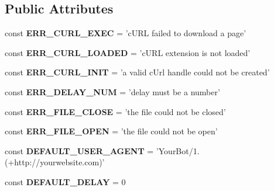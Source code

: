 \subsection*{Public Attributes}
\begin{DoxyCompactItemize}
\item 
\hypertarget{classCurl_a53d3e9dc49608272c42f0c415b7a661b}{const {\bfseries E\-R\-R\-\_\-\-C\-U\-R\-L\-\_\-\-E\-X\-E\-C} = 'c\-U\-R\-L failed to download a page'}\label{d0/d69/classCurl_a53d3e9dc49608272c42f0c415b7a661b}

\item 
\hypertarget{classCurl_a1959072729820f7c00b1f98797a33201}{const {\bfseries E\-R\-R\-\_\-\-C\-U\-R\-L\-\_\-\-L\-O\-A\-D\-E\-D} = 'c\-U\-R\-L extension is not loaded'}\label{d0/d69/classCurl_a1959072729820f7c00b1f98797a33201}

\item 
\hypertarget{classCurl_a71ac50dd86f462c8bd94b286131da012}{const {\bfseries E\-R\-R\-\_\-\-C\-U\-R\-L\-\_\-\-I\-N\-I\-T} = 'a valid c\-Url handle could not be created'}\label{d0/d69/classCurl_a71ac50dd86f462c8bd94b286131da012}

\item 
\hypertarget{classCurl_af514a5b42b3e720b3540c43a6c351d0e}{const {\bfseries E\-R\-R\-\_\-\-D\-E\-L\-A\-Y\-\_\-\-N\-U\-M} = 'delay must be a number'}\label{d0/d69/classCurl_af514a5b42b3e720b3540c43a6c351d0e}

\item 
\hypertarget{classCurl_a133e01cc5864fefd0a0f07b416c9858f}{const {\bfseries E\-R\-R\-\_\-\-F\-I\-L\-E\-\_\-\-C\-L\-O\-S\-E} = 'the file could not be closed'}\label{d0/d69/classCurl_a133e01cc5864fefd0a0f07b416c9858f}

\item 
\hypertarget{classCurl_adb2b2729ff050102d41f0dd7d5b7fd06}{const {\bfseries E\-R\-R\-\_\-\-F\-I\-L\-E\-\_\-\-O\-P\-E\-N} = 'the file could not be open'}\label{d0/d69/classCurl_adb2b2729ff050102d41f0dd7d5b7fd06}

\item 
\hypertarget{classCurl_a54fa08d59fdf6e6dbb66c119abc671dc}{const {\bfseries D\-E\-F\-A\-U\-L\-T\-\_\-\-U\-S\-E\-R\-\_\-\-A\-G\-E\-N\-T} = 'Your\-Bot/1. (+http\-://yourwebsite.\-com)'}\label{d0/d69/classCurl_a54fa08d59fdf6e6dbb66c119abc671dc}

\item 
\hypertarget{classCurl_a3320901fe69e587e362d6e84a370e2e2}{const {\bfseries D\-E\-F\-A\-U\-L\-T\-\_\-\-D\-E\-L\-A\-Y} = 0}\label{d0/d69/classCurl_a3320901fe69e587e362d6e84a370e2e2}

\end{DoxyCompactItemize}
